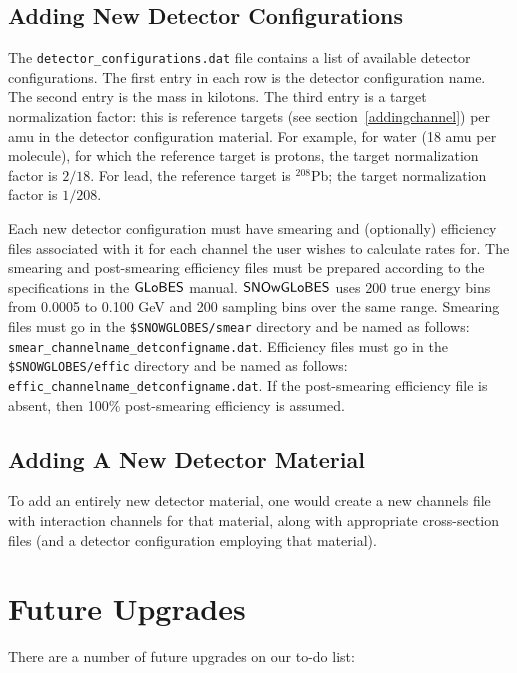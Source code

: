 \documentclass[12pt]{article}
\newcommand{\globes}{\sf{GLoBES}}
\newcommand{\snowglobes}{\sf{SNOwGLoBES}}
\begin{document}
\subsection{Adding New Detector Configurations}

The \texttt{detector\_configurations.dat} file contains a list of
available detector configurations.  The first entry in each row is the
detector configuration name.  The second entry is the mass in
kilotons.  The third entry is a target normalization factor: this is
reference targets (see section~\ref{addingchannel}) per
amu in the detector configuration material.  For example,
for water (18 amu per molecule), for which the reference target is protons, the target
normalization factor is $2/18$.  For lead, the reference target is
$^{208}$Pb; the target normalization factor is $1/208$.

Each new detector configuration must have smearing and
(optionally) efficiency files associated with it for each channel the
user wishes to calculate rates for.  The smearing and post-smearing
efficiency files must be prepared according to the specifications in
the $\globes$ manual.  $\snowglobes$ uses 200 true energy bins from 0.0005 to 0.100 GeV and 200 sampling bins over the same range. 
Smearing files must go in the
\texttt{\$SNOWGLOBES/smear} directory and be named as follows:
\texttt{smear\_channelname\_detconfigname.dat}.  Efficiency files must
go in the \texttt{\$SNOWGLOBES/effic} directory and be named as
follows: \texttt{effic\_channelname\_detconfigname.dat}.
If the post-smearing efficiency file is absent, then 100\% post-smearing efficiency is assumed.

\subsection{Adding A New Detector Material}

To add an entirely new detector material, one would create a new
channels file with interaction channels for that material, along with
appropriate cross-section files (and a detector
configuration employing that material).

\section{Future Upgrades}

There are a number of future upgrades on our to-do list:
\end{document}
